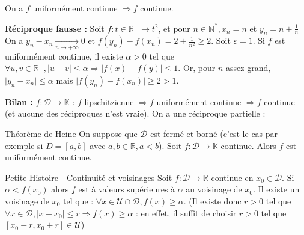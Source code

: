 \documentclass[12pt,a4paper]{report}
\begin{document}
On a $f$ uniformément continue $\Longrightarrow f$ continue. \newline

\begin{remarque}
\textbf{Réciproque fausse : } Soit $f : t \in \mathbb{R}_+ \longrightarrow t^2$,  et pour $n \in \mathbb{N}^*, x_n = n$ et $y_n = n + \frac{1}{n}$
\noindent On a $y_n - x_n \xrightarrow[n \rightarrow +\infty]{} 0$ et $f(y_n) - f(x_n) = 2 + \frac{1}{n^2} \geq 2$.
\newline Soit $\varepsilon = 1$. Si $f$ est uniformément continue, il existe $\alpha > 0$ tel que $\forall u,v \in \mathbb{R}_+, \lvert u-v \rvert \leq \alpha \Longrightarrow \lvert f(x) - f(y) \rvert \leq 1$.
\newline Or, pour $n$ assez grand, $\lvert y_n - x_n \rvert \leq \alpha$ mais $\lvert f(y_n) - f(x_n) \rvert \geq 2 > 1$.
\end{remarque}


\textbf{Bilan : } $f : \mathcal{D} \rightarrow \mathbb{K}$ : $f$ lipschitzienne $\Longrightarrow f$ uniformément continue $\Longrightarrow f$ continue (et aucune des réciproques n'est vraie).
\newline \newline On a une réciproque partielle :

\begin{theoreme}{Théorème de Heine}{}
On suppose que $\mathcal{D}$ est fermé et borné (c'est le cas par exemple si $D = \left[a,b\right]$ avec $a,b \in \mathbb{R}, a < b$). Soit $f : \mathcal{D} \rightarrow \mathbb{K}$ continue. Alors $f$ est uniformément continue.
\end{theoreme}

\begin{principedemo}{}

\end{principedemo}


\begin{proposition}{Petite Histoire - Continuité et voisinages}{}
Soit $f : \mathcal{D} \rightarrow \mathbb{R}$ continue en $x_0 \in \mathcal{D}$.
Si $\alpha < f(x_0)$ alors $f$ est à valeurs supérieures à $\alpha$ au voisinage de $x_0$. \newline
Il existe un voisinage de $x_0$ tel que : $\forall x \in \mathcal{U} \cap \mathcal{D}, f(x) \geq \alpha$.
\newline (Il existe donc $r > 0$ tel que $\forall x \in \mathcal{D}, \lvert x-x_0 \rvert \leq r \Longrightarrow f(x) \geq \alpha$ : en effet, il suffit de choisir $r > 0$ tel que $\left[x_0-r,x_0+r\right] \in \mathcal{U}$)
\end{proposition}
\end{document}
